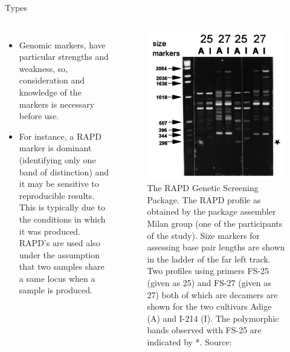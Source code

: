 \documentclass[
  ignorenonframetext,
  aspectratio=169]{beamer}
\providecommand{\tightlist}{%
  \setlength{\itemsep}{0pt}\setlength{\parskip}{0pt}}
\newcommand{\bcolumns}{\begin{columns}[T, onlytextwidth]}
\newcommand{\ecolumns}{\end{columns}}
\begin{document}
\begin{frame}{Types}
\protect\hypertarget{types}{}
\bcolumns
{}
\footnotesize

\begin{itemize}
\tightlist
\item
  Genomic markers, have particular strengths and weakness, so,
  consideration and knowledge of the markers is necessary before use.
\item
  For instance, a RAPD marker is dominant (identifying only one band of
  distinction) and it may be sensitive to reproducible results. This is
  typically due to the conditions in which it was produced. RAPD's are
  used also under the assumption that two samples share a same locus
  when a sample is produced.
\end{itemize}


\begin{figure}
\includegraphics[width=0.5\linewidth]{../images/rapd_marker_diagram} \caption{The RAPD Genetic Screening Package. The RAPD profile as obtained by the package assembler Milan group (one of the participants of the study). Size markers for assessing base pair lengths are shown in the ladder of the far left track. Two profiles using primers FS-25 (given as 25) and FS-27 (given as 27) both of which are decamers are shown for the two cultivars Adige (A) and I-214 (I). The polymorphic bands observed with FS-25 are indicated by *. Source: \cite{jones1997reproducibility}}\label{fig:rapd-markers}
\end{figure}

\ecolumns
\end{frame}
\end{document}
